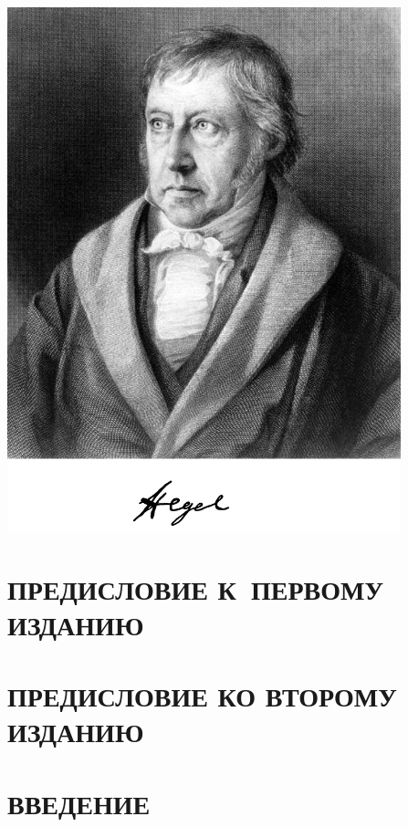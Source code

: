 \documentclass[a5paper, 10pt, twoside, onecolumn, openany]{memoir}
\begin{document}
\thispagestyle{plainfullpagecover}
\begin{center}
\includegraphics[width=11.4cm]{hegel-img001.png}
\end{center}

\restoregeometry

\chapter[Предисловие к~первому изданию]{\large ПРЕДИСЛОВИЕ К~ПЕРВОМУ ИЗДАНИЮ}


\clearpage

\chapter[Предисловие ко второму изданию]{\large ПРЕДИСЛОВИЕ КО ВТОРОМУ ИЗДАНИЮ}


\clearpage

\chapter[Введение]{ВВЕДЕНИЕ}

\end{document}
